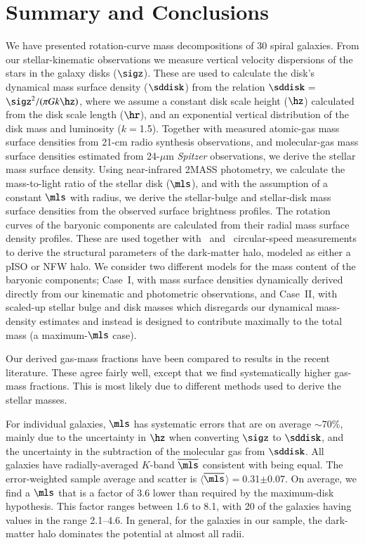 \documentclass[traditabstract]{aa} %
\begin{document}
\section{Summary and Conclusions}
\label{sec:Summary_DeComp}
We have presented rotation-curve mass decompositions of 30 spiral galaxies. From our
stellar-kinematic observations we measure vertical velocity dispersions of the stars in
the galaxy disks ($\sigz$). These are used to calculate the disk's dynamical mass surface
density ($\sddisk$) from the relation $\sddisk$$=$$\sigz^2/(\pi G k \hz)$, where we assume
a constant disk scale height ($\hz$) calculated from the disk scale length ($\hr$), and an
exponential vertical distribution of the disk mass and luminosity ($k$$=$1.5). Together
with measured atomic-gas mass surface densities from 21-cm radio synthesis observations,
and molecular-gas mass surface densities estimated from 24-$\mu$m {\it Spitzer}
observations, we derive the stellar mass surface density. Using near-infrared 2MASS
photometry, we calculate the mass-to-light ratio of the stellar disk ($\mls$), and with
the assumption of a constant $\mls$ with radius, we derive the stellar-bulge and 
stellar-disk mass surface densities from the observed surface brightness profiles.
The rotation curves of the baryonic components are calculated from their radial mass
surface density profiles. These are used together with \hone\ and \halp\ circular-speed
measurements to derive the structural parameters of the dark-matter halo, modeled as
either a pISO or NFW halo. We consider two different models for the mass content of the
baryonic components; Case~I, with mass surface densities dynamically derived directly from
our kinematic and photometric observations, and Case~II, with scaled-up stellar bulge and
disk masses which disregards our dynamical mass-density estimates and instead is designed
to contribute maximally to the total mass (a maximum-$\mls$ case).

Our derived gas-mass fractions have been compared to results in the recent literature.
These agree fairly well, except that we find systematically higher gas-mass fractions.
This is most likely due to different methods used to derive the stellar masses.

For individual galaxies, $\mls$ has systematic errors that are on average $\sim$70\%,
mainly due to the uncertainty in $\hz$ when converting $\sigz$ to $\sddisk$, and the
uncertainty in the subtraction of the molecular gas from $\sddisk$. All galaxies have
radially-averaged $K$-band $\overline{\mls}$ consistent with being equal. The 
error-weighted sample average and scatter is 
$\langle$$\overline{\mls}$$\rangle$$=$0.31$\pm$0.07. On average, we find a $\mls$ that is
a factor of 3.6 lower than required by the maximum-disk hypothesis. This factor ranges
between 1.6 to 8.1, with 20 of the galaxies having values in the range 2.1--4.6. In
general, for the galaxies in our sample, the dark-matter halo dominates the potential at
almost all radii.
\end{document}
